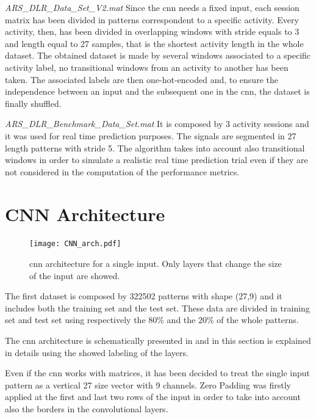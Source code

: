 \begin{LaTeXdescription}
	\item[\textit{ARS\_DLR\_Data\_Set\_V2.mat}]
		Since the \gls{cnn} needs a fixed input, each session matrix has been divided in patterns correspondent to a specific activity.
		Every activity, then, has been divided in overlapping windows with stride equals to 3 and length equal to 27 samples, that is the shortest activity length in the whole dataset. The obtained dataset is made by several windows associated to a specific activity label, no transitional windows from an activity to another has been taken. The associated labels are then one-hot-encoded and, to ensure the independence between an input and the subsequent one in the \gls{cnn}, the dataset is finally shuffled.

	\item[\textit{ARS\_DLR\_Benchmark\_Data\_Set.mat}]
		It is composed by 3 activity sessions and it was used for real time prediction purposes. The signals are segmented in 27 length patterns with stride 5. The algorithm takes into account also transitional windows in order to simulate a realistic real time prediction trial even if they are not considered in the computation of the performance metrics.
\end{LaTeXdescription}

\section{CNN Architecture}
\label{sec:cnn_architecture}

\begin{figure}[htp]
\texttt{[image: CNN\_arch.pdf]}
\caption{\gls{cnn} architecture for a single input. Only layers that change the size of the input are showed.}
\label{fig:CNN}
\end{figure}


The first dataset is composed by 322502 patterns with shape (27,9) and it includes both the training set and the test set. These data are divided in training set and test set using respectively the $80\%$ and the $20\%$  of the whole patterns.

The \gls{cnn} architecture is schematically presented in  and in this section is explained in details using the showed labeling of the layers.

Even if the \gls{cnn} works with matrices, it has been decided to treat the single input pattern as a vertical 27 size vector with 9 channels. Zero Padding was firstly applied at the first and last two rows of the input in order to take into account also the borders in the convolutional layers.

